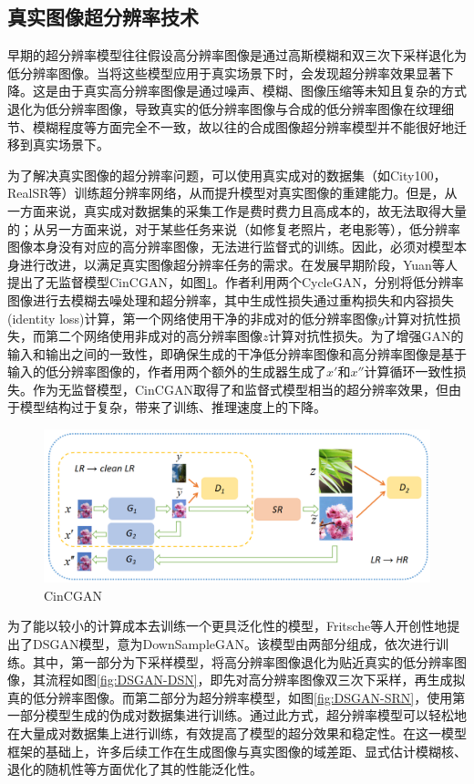 \subsection{真实图像超分辨率技术}
早期的超分辨率模型往往假设高分辨率图像是通过高斯模糊和双三次下采样退化为低分辨率图像。当将这些模型应用于真实场景下时，会发现超分辨率效果显著下降。这是由于真实高分辨率图像是通过噪声、模糊、图像压缩等未知且复杂的方式退化为低分辨率图像，导致真实的低分辨率图像与合成的低分辨率图像在纹理细节、模糊程度等方面完全不一致，故以往的合成图像超分辨率模型并不能很好地迁移到真实场景下。

为了解决真实图像的超分辨率问题，可以使用真实成对的数据集（如City100\cite{chen2019camera}，RealSR\cite{cai2019toward}等）训练超分辨率网络，从而提升模型对真实图像的重建能力。但是，从一方面来说，真实成对数据集的采集工作是费时费力且高成本的，故无法取得大量的；从另一方面来说，对于某些任务来说（如修复老照片，老电影等），低分辨率图像本身没有对应的高分辨率图像，无法进行监督式的训练。因此，必须对模型本身进行改进，以满足真实图像超分辨率任务的需求。在发展早期阶段，Yuan等人\cite{yuan2018unsupervised}提出了无监督模型CinCGAN，如图\ref{fig:CinCGAN}。作者利用两个CycleGAN\cite{zhu2017unpaired}，分别将低分辨率图像进行去模糊去噪处理和超分辨率，其中生成性损失通过重构损失和内容损失(identity loss)计算，第一个网络使用干净的非成对的低分辨率图像$y$计算对抗性损失，而第二个网络使用非成对的高分辨率图像$z$计算对抗性损失。为了增强GAN的输入和输出之间的一致性，即确保生成的干净低分辨率图像和高分辨率图像是基于输入的低分辨率图像的，作者用两个额外的生成器生成了$x'$和$x''$计算循环一致性损失。作为无监督模型，CinCGAN取得了和监督式模型相当的超分辨率效果，但由于模型结构过于复杂，带来了训练、推理速度上的下降。

\begin{figure}[htbp]
    \centering
    \includegraphics[width=1.0\textwidth]{imgs/CinCGAN.png}
    \caption{CinCGAN}
    \label{fig:CinCGAN}
\end{figure}

为了能以较小的计算成本去训练一个更具泛化性的模型，Fritsche等人\cite{fritsche2019frequency}开创性地提出了DSGAN模型，意为DownSampleGAN。该模型由两部分组成，依次进行训练。其中，第一部分为下采样模型，将高分辨率图像退化为贴近真实的低分辨率图像，其流程如图\ref{fig:DSGAN-DSN}，即先对高分辨率图像双三次下采样，再生成拟真的低分辨率图像。而第二部分为超分辨率模型，如图\ref{fig:DSGAN-SRN}，使用第一部分模型生成的伪成对数据集进行训练。通过此方式，超分辨率模型可以轻松地在大量成对数据集上进行训练，有效提高了模型的超分效果和稳定性。在这一模型框架的基础上，许多后续工作在生成图像与真实图像的域差距\cite{Wei_2021_CVPR}、显式估计模糊核\cite{fang2022uncertainty}\cite{liang2021mutual}\cite{fangself}、退化的随机性\cite{wang2021realesrgan}等方面优化了其的性能泛化性。

